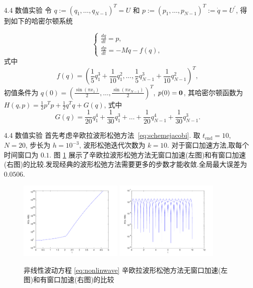 \documentclass{beamer}
\begin{document}
\begin{frame}{4.4 数值实验}
令 $q := (q_1, \ldots, q_{N-1})^{T}= U$ 和 $p :=(p_1, \ldots, p_{N-1})^{T}:= \dot{q} = U^{'}$, 得到如下的哈密尔顿系统

\begin{equation}\label{eq:nonlinwaveH}
  \left \{ \begin{array}{l}
      \displaystyle \frac{d q }{d t} = p,\\
      \displaystyle \frac{d p }{d t} = -Mq - f(q),
    \end{array} \right.
\end{equation}
式中
\begin{equation*}
  f(q) = (\frac{1}{5} q_1^3 + \frac{1}{10} q_1^2, \ldots,
  \frac{1}{5} q_{N-1}^3 + \frac{1}{10} q_{N-1}^2)^{T},
\end{equation*}
初值条件为 $q(0)=(\frac{\sin(\pi x_1)}{2}, \ldots,
\frac{\sin(\pi x_{N-1})}{2})^{T}$, $p(0)={\bf 0}$, 其哈密尔顿函数为
$H(q,p) = \frac{1}{2}p^{ T}p + \frac{1}{2}q^{T}q + G(q)$, 式中
\begin{equation*}
  G(q) = \frac{1}{20} q_1^4 + \frac{1}{30} q_1^3 + \ldots + \frac{1}{20}
  q_{N-1}^4 + \frac{1}{30} q_{N-1}^3.
\end{equation*}
\end{frame}

\begin{frame}{4.4 数值实验}
首先考虑辛欧拉波形松弛方法~\eqref{eq:schemejacobi}. 取 $t_{\text{end}} = 10$, $N=20$, 步长为 $h = 10^{-3}$, 波形松弛迭代次数为 $k=10$. 对于窗口加速方法,取每个时间窗口为 $0.1$. 图 \ref{fig:ex3seucom} 展示了辛欧拉波形松弛方法无窗口加速(左图)和有窗口加速(右图)的比较.发现经典的波形松弛方法需要更多的步数才能收敛.全局最大误差为 $0.0506$.

\begin{figure}[h!]
  \centering
  \includegraphics[width=0.45\textwidth]{03/Fig9-1.pdf}
  \includegraphics[width=0.45\textwidth]{03/Fig9-2.pdf}
  \caption{非线性波动方程 \eqref{eq:nonlinwave} 辛欧拉波形松弛方法无窗口加速(左图)和有窗口加速(右图)的比较}
  \label{fig:ex3seucom}
\end{figure}
\end{frame}
\end{document}
